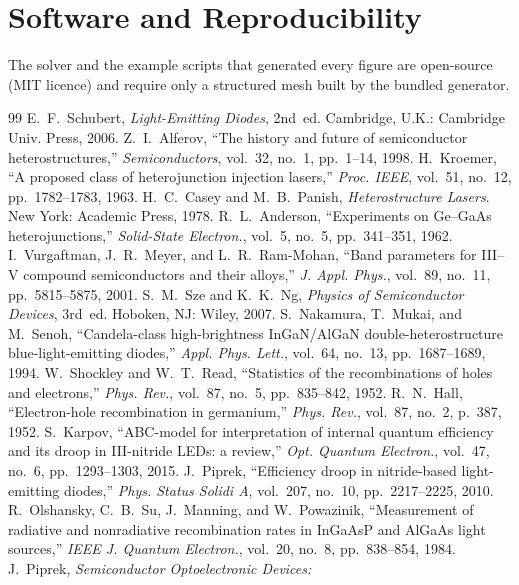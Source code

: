 \documentclass[conference]{IEEEtran}
\begin{document}
\section*{Software and Reproducibility}
The solver and the example scripts that generated every figure are open-source
(MIT licence) and require only a structured mesh built by the bundled generator.

\begin{thebibliography}{99}
 E.~F.~Schubert, \emph{Light-Emitting Diodes}, 2nd~ed.
Cambridge, U.K.: Cambridge Univ. Press, 2006.
 Z.~I.~Alferov, ``The history and future of semiconductor
heterostructures,'' \emph{Semiconductors}, vol.~32, no.~1, pp.~1--14, 1998.
 H.~Kroemer, ``A proposed class of heterojunction injection
lasers,'' \emph{Proc. IEEE}, vol.~51, no.~12, pp.~1782--1783, 1963.
 H.~C.~Casey and M.~B.~Panish, \emph{Heterostructure Lasers}.
New York: Academic Press, 1978.
 R.~L.~Anderson, ``Experiments on Ge--GaAs heterojunctions,''
\emph{Solid-State Electron.}, vol.~5, no.~5, pp.~341--351, 1962.
 I.~Vurgaftman, J.~R.~Meyer, and L.~R.~Ram-Mohan, ``Band
parameters for III--V compound semiconductors and their alloys,'' \emph{J. Appl.
Phys.}, vol.~89, no.~11, pp.~5815--5875, 2001.
 S.~M.~Sze and K.~K.~Ng, \emph{Physics of Semiconductor Devices},
3rd~ed. Hoboken, NJ: Wiley, 2007.
 S.~Nakamura, T.~Mukai, and M.~Senoh, ``Candela-class
high-brightness InGaN/AlGaN double-heterostructure blue-light-emitting diodes,''
\emph{Appl. Phys. Lett.}, vol.~64, no.~13, pp.~1687--1689, 1994.
 W.~Shockley and W.~T.~Read, ``Statistics of the recombinations
of holes and electrons,'' \emph{Phys. Rev.}, vol.~87, no.~5, pp.~835--842, 1952.
 R.~N.~Hall, ``Electron-hole recombination in germanium,''
\emph{Phys. Rev.}, vol.~87, no.~2, p.~387, 1952.
 S.~Karpov, ``ABC-model for interpretation of internal quantum
efficiency and its droop in III-nitride LEDs: a review,'' \emph{Opt. Quantum
Electron.}, vol.~47, no.~6, pp.~1293--1303, 2015.
 J.~Piprek, ``Efficiency droop in nitride-based
light-emitting diodes,'' \emph{Phys. Status Solidi A}, vol.~207, no.~10,
pp.~2217--2225, 2010.
 R.~Olshansky, C.~B.~Su, J.~Manning, and W.~Powazinik,
``Measurement of radiative and nonradiative recombination rates in InGaAsP and
AlGaAs light sources,'' \emph{IEEE J. Quantum Electron.}, vol.~20, no.~8,
pp.~838--854, 1984.
 J.~Piprek, \emph{Semiconductor Optoelectronic Devices:
}
\end{thebibliography}
\end{document}
